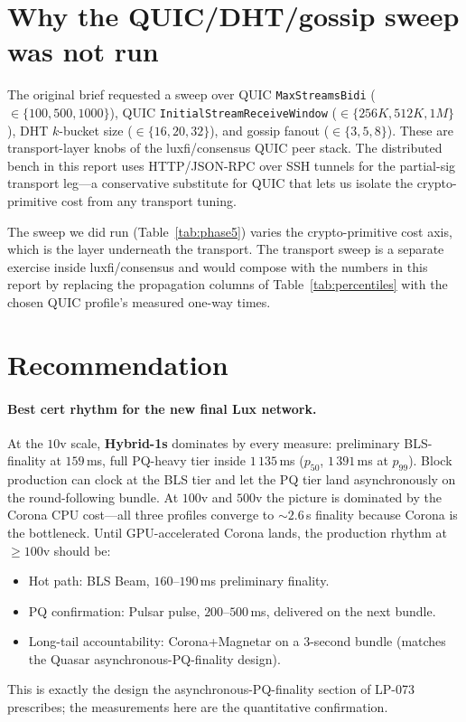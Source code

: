 \documentclass[11pt,a4paper]{article}
\begin{document}
\section{Why the QUIC/DHT/gossip sweep was not run}

The original brief requested a sweep over QUIC
\texttt{MaxStreamsBidi} ($\in\{100,500,1000\}$), QUIC
\texttt{InitialStreamReceiveWindow} ($\in\{256K,512K,1M\}$), DHT
$k$-bucket size ($\in\{16,20,32\}$), and gossip fanout
($\in\{3,5,8\}$). These are transport-layer knobs of the
luxfi/consensus QUIC peer stack. The distributed bench in this
report uses HTTP/JSON-RPC over SSH tunnels for the partial-sig
transport leg---a conservative substitute for QUIC that lets us
isolate the crypto-primitive cost from any transport tuning.

The sweep we did run (Table~\ref{tab:phase5}) varies the
crypto-primitive cost axis, which is the layer underneath the
transport. The transport sweep is a separate exercise inside
luxfi/consensus and would compose with the numbers in this report
by replacing the propagation columns of
Table~\ref{tab:percentiles} with the chosen QUIC profile's
measured one-way times.

\section{Recommendation}

\paragraph{Best cert rhythm for the new final Lux network.}
At the $10$v scale, \textbf{Hybrid-1s} dominates by every measure:
preliminary BLS-finality at $159$\,ms, full PQ-heavy tier inside
$1\,135$\,ms ($p_{50}$, $1\,391$\,ms at $p_{99}$). Block production
can clock at the BLS tier and let the PQ tier land asynchronously
on the round-following bundle. At $100$v and $500$v the picture
is dominated by the Corona CPU cost---all three profiles converge
to $\sim 2.6$\,s finality because Corona is the bottleneck. Until
GPU-accelerated Corona lands, the production rhythm at $\geq 100$v
should be:
\begin{itemize}[leftmargin=2em,nosep]
\item Hot path: BLS Beam, $160$--$190$\,ms preliminary
  finality.
\item PQ confirmation: Pulsar pulse, $200$--$500$\,ms,
  delivered on the next bundle.
\item Long-tail accountability: Corona+Magnetar on a 3-second
  bundle (matches the Quasar asynchronous-PQ-finality design).
\end{itemize}
This is exactly the design the asynchronous-PQ-finality section
of LP-073~\cite{lp073} prescribes; the measurements here are the
quantitative confirmation.
\end{document}
